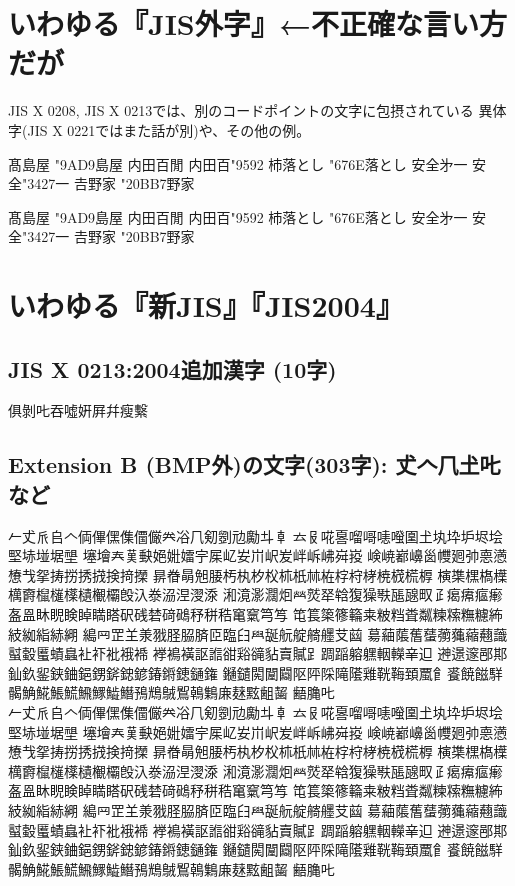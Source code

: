\documentclass{ujarticle}
\begin{document}
\section{いわゆる『JIS外字』←不正確な言い方だが}

JIS X 0208, JIS X 0213では、別のコードポイントの文字に包摂されている
異体字(JIS X 0221ではまた話が別)や、その他の例。

髙島屋 \kchar"9AD9島屋\quad%
内田百閒 内田百\kchar"9592\quad%
杮落とし \kchar"676E落とし\quad%
安全﻿㐧一 安全\kchar"3427一\quad%
𠮷野家 \kchar"20BB7野家%

{\gt
髙島屋 \kchar"9AD9島屋\quad%
内田百閒 内田百\kchar"9592\quad%
杮落とし \kchar"676E落とし\quad%
安全﻿㐧一 安全\kchar"3427一\quad%
𠮷野家 \kchar"20BB7野家%
}

\section{いわゆる『新JIS』『JIS2004』}
\subsection{JIS X 0213:2004追加漢字 (10字)}
俱剝𠮟吞噓姸屛幷瘦繫

\subsection{Extension B (BMP外)の文字(303字): 𠀋𠆢𠘨𡈽𠮟など}

𠂉𠀋𠂢𠂤𠆢𠈓𠌫𠎁𠍱𠏹𠑊𠔉𠗖𠘨𠝏𠠇𠠺𠢹𠥼𠦝
𠫓𠬝𠵅𠷡𠺕𠹭𠹤𠽟𡈁𡈽𡉕𡉻𡉴𡋤𡋗𡌛𡋽𡌶𡍄𡏄
𡑮𡑭𡗗𦰩𡙇𡜆𡝂𡢽𡧃𡱖𡴭𡚴𡵅𡵸𡵢𡶡𡶜𡶒𡶷𡷠
𡸴𡸳𡼞𡽶𡿺𢅻𢌞𢎭𢛳𢡛𢢫𢦏𢪸𢭏𢭐𢭆𢰝𢮦𢰤𢷡
𣇄𣇃𣇵𣆶𣍲𣏓𣏒𣏐𣏤𣏕𣏚𣏟𣑊𣑑𣑋𣑥𣓤𣕚𣗄𣖔
𣘹𣙇𣘸𣘺𣜿𣜜𣝣𣜌𣝤𣟿𣟧𣠤𣠽𣪘𣱿𣳾𣴀𣵀𣷺𣷹
𣷓𣽾𤂖𤄃𤇆𤇾𤎼𤘩𤚥𤟱𤢖𤩍𤭖𤭯𤰖𤴔𤸎𤸷𤹪𤺋
𥁊𥁕𥄢𥆩𥇥𥇍𥈞𥉌𥐮𥒎𥓙𥔎𥖧𥝱𥞩𥞴𥧄𥧔𥫤𥫣
𥫱𥮲𥱋𥱤𥶡𥸮𥹖𥹥𥹢𥻘𥻂𥻨𥼣𥽜𥿠𥿔𦀌𥿻𦀗𦁠
𦃭𦉰𦊆𦍌𣴎𦐂𦙾𦚰𦜝𦣝𦣪𦥑𦥯𦧝𦨞𦩘𦪌𦪷𦫿𦱳
𦳝𦹀𦹥𦾔𦿸𦿶𦿷𧃴𧄍𧄹𧏛𧏚𧏾𧐐𧑉𧘕𧘔𧘱𧚄𧚓
𧜎𧜣𧝒𧦅𧪄𧮳𧮾𧯇𧲸𧶠𧸐𧾷𨂊𨂻𨉷𨊂𨋳𨏍𨐌𨑕
𨕫𨗈𨗉𨛗𨛺𨥉𨥆𨥫𨦇𨦈𨦺𨦻𨨞𨨩𨩱𨩃𨪙𨫍𨫤𨫝
𨯁𨯯𨴐𨵱𨷻𨸟𨸶𨺉𨻫𨼲𨿸𩊠𩊱𩒐𩗏𩙿𩛰𩜙𩝐𩣆
𩩲𩷛𩸽𩸕𩺊𩹉𩻄𩻩𩻛𩿎𪀯𪀚𪃹𪂂𪆐𢈘𪎌𪐷𪗱𪘂
𪘚𪚲𠮟\\
%
{\gt
𠂉𠀋𠂢𠂤𠆢𠈓𠌫𠎁𠍱𠏹𠑊𠔉𠗖𠘨𠝏𠠇𠠺𠢹𠥼𠦝
𠫓𠬝𠵅𠷡𠺕𠹭𠹤𠽟𡈁𡈽𡉕𡉻𡉴𡋤𡋗𡌛𡋽𡌶𡍄𡏄
𡑮𡑭𡗗𦰩𡙇𡜆𡝂𡢽𡧃𡱖𡴭𡚴𡵅𡵸𡵢𡶡𡶜𡶒𡶷𡷠
𡸴𡸳𡼞𡽶𡿺𢅻𢌞𢎭𢛳𢡛𢢫𢦏𢪸𢭏𢭐𢭆𢰝𢮦𢰤𢷡
𣇄𣇃𣇵𣆶𣍲𣏓𣏒𣏐𣏤𣏕𣏚𣏟𣑊𣑑𣑋𣑥𣓤𣕚𣗄𣖔
𣘹𣙇𣘸𣘺𣜿𣜜𣝣𣜌𣝤𣟿𣟧𣠤𣠽𣪘𣱿𣳾𣴀𣵀𣷺𣷹
𣷓𣽾𤂖𤄃𤇆𤇾𤎼𤘩𤚥𤟱𤢖𤩍𤭖𤭯𤰖𤴔𤸎𤸷𤹪𤺋
𥁊𥁕𥄢𥆩𥇥𥇍𥈞𥉌𥐮𥒎𥓙𥔎𥖧𥝱𥞩𥞴𥧄𥧔𥫤𥫣
𥫱𥮲𥱋𥱤𥶡𥸮𥹖𥹥𥹢𥻘𥻂𥻨𥼣𥽜𥿠𥿔𦀌𥿻𦀗𦁠
𦃭𦉰𦊆𦍌𣴎𦐂𦙾𦚰𦜝𦣝𦣪𦥑𦥯𦧝𦨞𦩘𦪌𦪷𦫿𦱳
𦳝𦹀𦹥𦾔𦿸𦿶𦿷𧃴𧄍𧄹𧏛𧏚𧏾𧐐𧑉𧘕𧘔𧘱𧚄𧚓
𧜎𧜣𧝒𧦅𧪄𧮳𧮾𧯇𧲸𧶠𧸐𧾷𨂊𨂻𨉷𨊂𨋳𨏍𨐌𨑕
𨕫𨗈𨗉𨛗𨛺𨥉𨥆𨥫𨦇𨦈𨦺𨦻𨨞𨨩𨩱𨩃𨪙𨫍𨫤𨫝
𨯁𨯯𨴐𨵱𨷻𨸟𨸶𨺉𨻫𨼲𨿸𩊠𩊱𩒐𩗏𩙿𩛰𩜙𩝐𩣆
𩩲𩷛𩸽𩸕𩺊𩹉𩻄𩻩𩻛𩿎𪀯𪀚𪃹𪂂𪆐𢈘𪎌𪐷𪗱𪘂
𪘚𪚲𠮟
}
\end{document}
